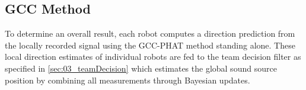 
\subsection{GCC Method}
\label{04_teamGcc}

To determine an overall result, each robot computes a direction prediction from
the locally recorded signal using the \ac{GCC-PHAT} method standing
alone.
These local direction estimates of individual robots are fed to the team
decision filter as specified in \cref{sec:03_teamDecision} which estimates the
global sound source position by combining all measurements through Bayesian
updates.


